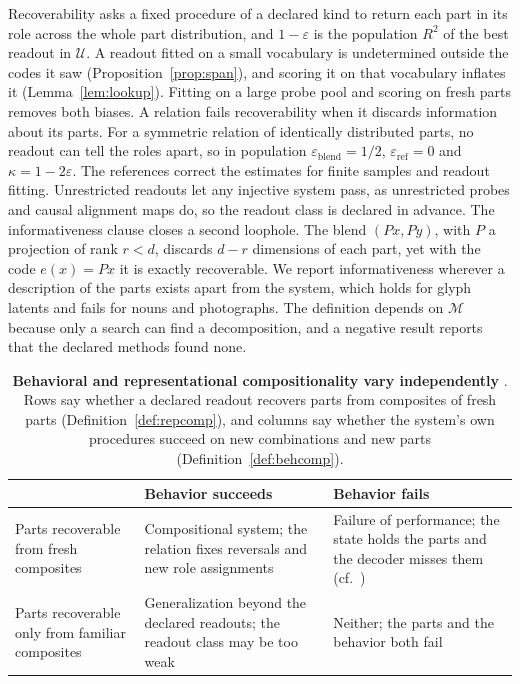 \documentclass[10pt]{article}
\theoremstyle{plain}
\theoremstyle{remark}
\newcommand{\U}{\mathcal{U}}
\newcommand{\M}{\mathcal{M}}
\begin{document}
Recoverability asks a fixed procedure of a declared kind to return each part in its role across the whole part distribution, and $1 - \varepsilon$ is the population $R^2$ of the best readout in $\U$. A readout fitted on a small vocabulary is undetermined outside the codes it saw (Proposition~\ref{prop:span}), and scoring it on that vocabulary inflates it (Lemma~\ref{lem:lookup}). Fitting on a large probe pool and scoring on fresh parts removes both biases. A relation fails recoverability when it discards information about its parts. For a symmetric relation of identically distributed parts, no readout can tell the roles apart, so in population $\varepsilon_{\mathrm{blend}} = 1/2$, $\varepsilon_{\mathrm{ref}} = 0$ and $\kappa = 1 - 2\varepsilon$. The references correct the estimates for finite samples and readout fitting. Unrestricted readouts let any injective system pass, as unrestricted probes \citep{hewitt2019} and causal alignment maps \citep{sutter2025} do, so the readout class is declared in advance. The informativeness clause closes a second loophole. The blend $(Px, Py)$, with $P$ a projection of rank $r < d$, discards $d - r$ dimensions of each part, yet with the code $e(x) = Px$ it is exactly recoverable. We report informativeness wherever a description of the parts exists apart from the system, which holds for glyph latents and fails for nouns and photographs. The definition depends on $\M$ because only a search can find a decomposition, and a negative result reports that the declared methods found none.

\begin{table}[tbp]
  \caption{\textbf{Behavioral and representational compositionality vary independently} \citep[cf.][]{vegner2025}. Rows say whether a declared readout recovers parts from composites of fresh parts (Definition~\ref{def:repcomp}), and columns say whether the system's own procedures succeed on new combinations and new parts (Definition~\ref{def:behcomp}).}
  \label{tab:twobytwo}
  \centering\small
  \begin{tabularx}{\linewidth}{@{}P{3.2cm}YY@{}}
    \toprule
    & Behavior succeeds & Behavior fails \\
    \midrule
    Parts recoverable from fresh composites & Compositional system; the relation fixes reversals and new role assignments & Failure of performance; the state holds the parts and the decoder misses them (cf.\ \citealt{montero2021,park2024hidden}) \\
    Parts recoverable only from familiar composites & Generalization beyond the declared readouts; the readout class may be too weak & Neither; the parts and the behavior both fail \\
    \bottomrule
  \end{tabularx}
\end{table}
\end{document}
